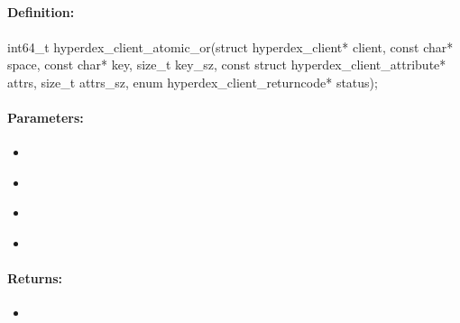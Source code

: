 \pagebreak
\subsection{}
\label{api:c:atomic_or}


\paragraph{Definition:}
\begin{ccode}
int64_t hyperdex_client_atomic_or(struct hyperdex_client* client,
        const char* space,
        const char* key, size_t key_sz,
        const struct hyperdex_client_attribute* attrs, size_t attrs_sz,
        enum hyperdex_client_returncode* status);
\end{ccode}

\paragraph{Parameters:}
\begin{itemize}[noitemsep]
\item {}\\

\item {}\\

\item {}\\

\item {}\\

\end{itemize}

\paragraph{Returns:}
\begin{itemize}[noitemsep]
\item {}\\

\end{itemize}

